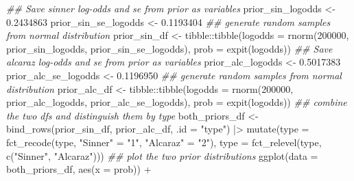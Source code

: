 \documentclass[
  letterpaper,
  DIV=11,
  numbers=noendperiod]{scrartcl}
\newenvironment{Shaded}{\begin{snugshade}}{\end{snugshade}}
\newcommand{\AttributeTok}[1]{\textcolor[rgb]{0.40,0.45,0.13}{#1}}
\newcommand{\DecValTok}[1]{\textcolor[rgb]{0.68,0.00,0.00}{#1}}
\newcommand{\DocumentationTok}[1]{\textcolor[rgb]{0.37,0.37,0.37}{\textit{#1}}}
\newcommand{\FloatTok}[1]{\textcolor[rgb]{0.68,0.00,0.00}{#1}}
\newcommand{\FunctionTok}[1]{\textcolor[rgb]{0.28,0.35,0.67}{#1}}
\newcommand{\NormalTok}[1]{\textcolor[rgb]{0.00,0.23,0.31}{#1}}
\newcommand{\OtherTok}[1]{\textcolor[rgb]{0.00,0.23,0.31}{#1}}
\newcommand{\SpecialCharTok}[1]{\textcolor[rgb]{0.37,0.37,0.37}{#1}}
\newcommand{\StringTok}[1]{\textcolor[rgb]{0.13,0.47,0.30}{#1}}
\begin{document}
\begin{Shaded}
\begin{Highlighting}[]
\DocumentationTok{\#\# Save sinner log{-}odds and se from prior as variables}
\NormalTok{prior\_sin\_logodds }\OtherTok{\textless{}{-}} \FloatTok{0.2434863}
\NormalTok{prior\_sin\_se\_logodds }\OtherTok{\textless{}{-}} \FloatTok{0.1193404}
\DocumentationTok{\#\# generate random samples from normal distribution}
\NormalTok{prior\_sin\_df }\OtherTok{\textless{}{-}}\NormalTok{ tibble}\SpecialCharTok{::}\FunctionTok{tibble}\NormalTok{(}\AttributeTok{logodds =} \FunctionTok{rnorm}\NormalTok{(}\DecValTok{200000}\NormalTok{,}
\NormalTok{                                                 prior\_sin\_logodds,}
\NormalTok{                                                 prior\_sin\_se\_logodds),}
                           \AttributeTok{prob =} \FunctionTok{expit}\NormalTok{(logodds))}
\DocumentationTok{\#\# Save alcaraz log{-}odds and se from prior as variables}
\NormalTok{prior\_alc\_logodds }\OtherTok{\textless{}{-}} \FloatTok{0.5017383}
\NormalTok{prior\_alc\_se\_logodds }\OtherTok{\textless{}{-}} \FloatTok{0.1196950}
\DocumentationTok{\#\# generate random samples from normal distribution}
\NormalTok{prior\_alc\_df }\OtherTok{\textless{}{-}}\NormalTok{ tibble}\SpecialCharTok{::}\FunctionTok{tibble}\NormalTok{(}\AttributeTok{logodds =} \FunctionTok{rnorm}\NormalTok{(}\DecValTok{200000}\NormalTok{,}
\NormalTok{                                                 prior\_alc\_logodds,}
\NormalTok{                                                 prior\_alc\_se\_logodds),}
                           \AttributeTok{prob =} \FunctionTok{expit}\NormalTok{(logodds))}
\DocumentationTok{\#\# combine the two dfs and distinguish them by type}
\NormalTok{both\_priors\_df }\OtherTok{\textless{}{-}} \FunctionTok{bind\_rows}\NormalTok{(prior\_sin\_df, prior\_alc\_df, }\AttributeTok{.id =} \StringTok{"type"}\NormalTok{) }\SpecialCharTok{|\textgreater{}}
  \FunctionTok{mutate}\NormalTok{(}\AttributeTok{type =} \FunctionTok{fct\_recode}\NormalTok{(type, }\StringTok{"Sinner"} \OtherTok{=} \StringTok{"1"}\NormalTok{,}
                           \StringTok{"Alcaraz"} \OtherTok{=} \StringTok{"2"}\NormalTok{),}
         \AttributeTok{type =} \FunctionTok{fct\_relevel}\NormalTok{(type, }\FunctionTok{c}\NormalTok{(}\StringTok{"Sinner"}\NormalTok{, }\StringTok{"Alcaraz"}\NormalTok{)))}
\DocumentationTok{\#\# plot the two prior distributions}
\FunctionTok{ggplot}\NormalTok{(}\AttributeTok{data =}\NormalTok{ both\_priors\_df, }\FunctionTok{aes}\NormalTok{(}\AttributeTok{x =}\NormalTok{ prob)) }\SpecialCharTok{+}

\end{Highlighting}
\end{Shaded}
\end{document}
